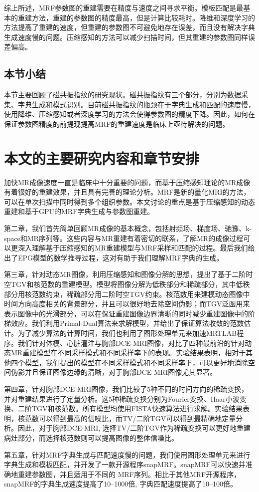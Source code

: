 综上所述，MRF参数图的重建需要在精度与速度之间寻求平衡。模板匹配是最基本的重建方法，重建的参数图的精度最高，但是计算比较耗时。降维和深度学习的方法提高了重建的速度，但重建的参数图不可避免地存在误差，而且没有解决字典生成速度慢的问题。压缩感知的方法可以减少扫描时间，但其重建的参数图同样误差偏高。

\subsection{本节小结}
本节主要回顾了磁共振指纹的研究现状。磁共振指纹有三个部分，分别为数据采集、字典生成和模式识别。目前磁共振指纹的瓶颈在于字典生成和匹配的速度慢，使用降维、压缩感知或者深度学习的方法会使得参数图的精度下降。因此，如何在保证参数图精度的前提现提高MRF的重建速度是临床上亟待解决的问题。

\section{本文的主要研究内容和章节安排}
加快MR成像速度一直是临床中十分重要的问题，而基于压缩感知理论的MR成像有着很好的重建效果，并且具有完善的理论分析。MRF是新的量化MRI的方法，可以在单次扫描中同时得到多个组织参数。本文讨论的重点是基于压缩感知的动态重建和基于GPU的MRF字典生成与参数图重建。

第二章，我们首先简单回顾MR成像的基本概念，包括射频场、梯度场、驰豫、k-space和MR序列等。这些内容与MR重建有着密切的联系，了解MR的成像过程可以更深入理解基于压缩感知的MR重建模型与MRF采样和匹配的过程。最后我们给出了EPG模型的数学推导过程，这对有助于我们理解MRF字典的生成。

第三章，针对动态MR图像，利用压缩感知和图像分解的思想，提出了基于二阶时空TGV和核范数的重建模型。模型将图像分解为低秩部分和稀疏部分，其中低秩部分用核范数约束，稀疏部分用二阶时空TGV约束。核范数用来建模动态图像中时间方向高度相关的背景部分，并且可以很好地去除空间伪影；而TGV泛函用来表示图像中的光滑部分，可以在保证重建图像边界清晰的同时减少重建图像中的阶梯效应。我们利用Primal-Dual算法来求解模型，并给出了保证算法收敛的范数估计。为了减少算法的计算时间，我们也利用了图形处理单元来加速MRTLAB程序。我们针对体模、心脏灌注与胸部DCE-MRI图像，对比了四种最前沿的针对动态MR重建模型在不同采样模式和不同采样率下的表现。实验结果表明，相对于其他四个模型，我们提出的模型在不同采样模式和不同采样率下，可以更好地消除空间伪影并且保证图像边缘的清晰，对于胸部DCE-MRI图像尤其显著。

第四章，针对胸部DCE-MRI图像，我们比较了5种不同的时间方向的稀疏变换，并对重建结果进行了定量分析。这5种稀疏变换分别为Fourier变换、Haar小波变换、二阶TGV和核范数。所有模型均使用FISTA快速算法进行求解。实验结果表明，核范数可以得到最高的信噪比，而TV/二阶TGV可以得到最精确地定量分析。因此，对于胸部DCE-MRI, 选择TV/二阶TGV作为稀疏变换可以更好地重建病灶部分，而选择核范数则可以提高图像的整体信噪比。

第五章，针对MRF字典生成与匹配速度慢的问题，我们使用图形处理单元来进行字典生成和模板匹配，并开发了一款开源程序snapMRF。snapMRF可以快速并准确地重建参数图，并且适用于不同的 MRF序列。相比于其他MRF开源程序，snapMRF的字典生成速度提高了10--1000倍, 字典匹配速度提高了10--100倍。







